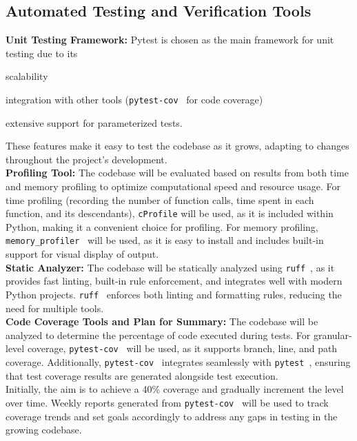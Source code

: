 \documentclass[12pt, titlepage]{article}
\begin{document}
\subsection{Automated Testing and Verification Tools}

\textbf{Unit Testing Framework:} Pytest is chosen as the main framework for unit testing due to its \begin{inparaenum}[(i)]
  \item scalability
  \item integration with other tools (\texttt{pytest-cov}~\cite{pytest-cov} for code coverage)
  \item extensive support for parameterized tests.
  \end{inparaenum} These features make it easy to test the codebase as it grows, adapting to changes throughout the project's development.\\
  
\noindent\textbf{Profiling Tool:} The codebase will be evaluated based on results from both time and memory profiling to optimize computational speed and resource usage. For time profiling (recording the number of function calls, time spent in each function, and its descendants), \texttt{cProfile} will be used, as it is included within Python, making it a convenient choice for profiling. For memory profiling, \texttt{memory\_profiler}~\cite{memory_profiler} will be used, as it is easy to install and includes built-in support for visual display of output.\\
  
\noindent\textbf{Static Analyzer:} The codebase will be statically analyzed using \texttt{ruff}~\cite{ruff}, as it provides fast linting, built-in rule enforcement, and integrates well with modern Python projects. \texttt{ruff}~\cite{ruff} enforces both linting and formatting rules, reducing the need for multiple tools.\\
  
\noindent\textbf{Code Coverage Tools and Plan for Summary:} The codebase will be analyzed to determine the percentage of code executed during tests. For granular-level coverage, \texttt{pytest-cov}~\cite{pytest-cov} will be used, as it supports branch, line, and path coverage. Additionally, \texttt{pytest-cov}~\cite{pytest-cov} integrates seamlessly with \texttt{pytest}~\cite{pytest}, ensuring that test coverage results are generated alongside test execution.\\

Initially, the aim is to achieve a 40\% coverage and gradually increment the level over time. Weekly reports generated from \texttt{pytest-cov}~\cite{pytest-cov} will be used to track coverage trends and set goals accordingly to address any gaps in testing in the growing codebase.\\
  
\end{document}
